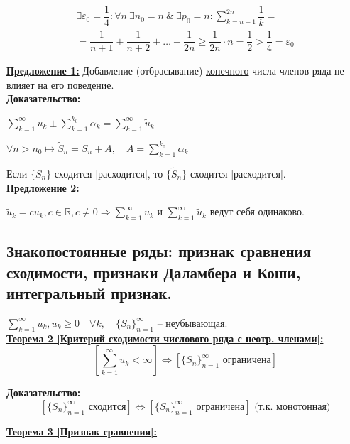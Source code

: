 \documentclass[a4paper,12pt]{article} %
\newcommand{\R}{\mathbb{R}}
\newcommand{\useries}{\sum\limits_{k=1}^{\infty} u_k}
\newcommand{\useriesl}{\sum\limits_{k=1}^{\infty} u_k < \infty}
\begin{document}
\begin{multline*}
	\exists \varepsilon_0 = \dfrac{1}{4}: \forall n \ \exists n_0 = n \ \& \ \exists p_0 = n: \sum\limits_{k = n+1}^{2n} \dfrac{1}{k} = \\ = \dfrac{1}{n+1}+ \dfrac{1}{n+2} + \ldots + \dfrac{1}{2n} \geqslant \dfrac{1}{2n} \cdot n = \dfrac{1}{2} > \dfrac{1}{4} = \varepsilon_0
\end{multline*}

\underline{\textbf{Предложение 1:}} Добавление (отбрасывание) \underline{конечного} числа членов ряда не влияет на его поведение.\\

\textbf{Доказательство:}

$\useries \pm \sum\limits_{k=1}^{k_0} \alpha_k = \sum\limits_{k=1}^{\infty} \tilde{u}_k$

$\forall n > n_0 \mapsto \tilde{S}_n = S_n + A, \hspace{1em} A = \sum\limits_{k=1}^{k_0} \alpha_k$

Если $\{ S_n \}$ сходится [расходится], то $\{ \tilde{S}_n \}$ сходится [расходится].\\

\underline{\textbf{Предложение 2:}}

$\tilde{u}_k = cu_k, c \in \R, c \neq 0 \Rightarrow \useries \text{ и } \sum\limits_{k=1}^{\infty} \tilde{u}_k$ ведут себя одинаково.

\subsection{Знакопостоянные ряды: признак сравнения сходимости, признаки Даламбера и Коши, интегральный признак.}

$\useries, u_k \geqslant 0 \hspace{1em} \forall k, \hspace{1em} \{ S_n \}_{n=1}^{\infty} $ -- неубывающая.\\

\underline{\textbf{Теорема 2 [Критерий сходимости числового ряда с неотр. членами]:}}
\[ \left[ \useriesl \right] \Leftrightarrow \left[ \{ S_n \}_{n=1}^{\infty} \text{ ограничена} \right] \]

\textbf{Доказательство:}
\[ \left[ \{ S_n \}_{n=1}^{\infty} \text{ сходится} \right] \Leftrightarrow \left[ \{ S_n \}_{n=1}^{\infty} \text{ ограничена} \right] \text{ (т.к. монотонная)} \]

\underline{\textbf{Теорема 3 [Признак сравнения]:}}
\end{document}
